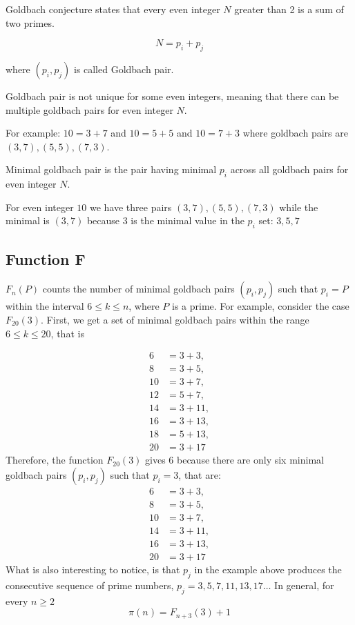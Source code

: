 \usepackage{amsmath}Goldbach conjecture states that every even integer $N$ greater than 2 is a sum of two primes.

$$N = p_i + p_j$$

where $(p_i, p_j)$ is called Goldbach pair.

Goldbach pair is not unique for some even integers, meaning that there can be multiple goldbach pairs for even integer $N$.

For example: $10=3+7$ and $10=5+5$ and $10=7+3$ where goldbach pairs are $(3,7), (5,5), (7,3)$.

Minimal goldbach pair is the pair having minimal $p_i$ across all goldbach pairs for even integer $N$.

For even integer $10$ we have three pairs $(3,7), (5,5), (7,3)$ while the minimal is $(3,7)$ because
$3$ is the minimal value in the $p_i$ set: $3, 5, 7$

\subsection{Function F}\label{subsec:function-f}
$F_{n}(P)$ counts the number of minimal goldbach pairs $(p_i, p_j)$ such that $p_i=P$ within the interval $6 \leq k \leq n$,
where $P$ is a prime.
For example, consider the case $F_{20}(3)$.
First, we get a set of minimal goldbach pairs within the range $6 \leq k \leq 20$, that is

\begin{align*}
    6 &= 3 + 3, \\
    8 &= 3 + 5, \\
    10 &= 3 + 7, \\
    12 &= 5 + 7, \\
    14 &= 3 + 11, \\
    16 &= 3 + 13, \\
    18 &= 5 + 13, \\
    20 &= 3 + 17
\end{align*}
Therefore, the function $F_{20}(3)$ gives $6$ because there are only six minimal goldbach pairs $(p_i, p_j)$ such that
$p_i=3$, that are:
\begin{align*}
    6 &= 3 + 3, \\
    8 &= 3 + 5, \\
    10 &= 3 + 7, \\
    14 &= 3 + 11, \\
    16 &= 3 + 13, \\
    20 &= 3 + 17
\end{align*}
What is also interesting to notice, is that $p_j$ in the example above produces the consecutive sequence of prime numbers,
$p_j = 3, 5, 7, 11, 13, 17 \dots$
In general, for every $n \geq 2$
\begin{equation*}
    \pi (n) = F_{n+3}(3) +1
\end{equation*}
